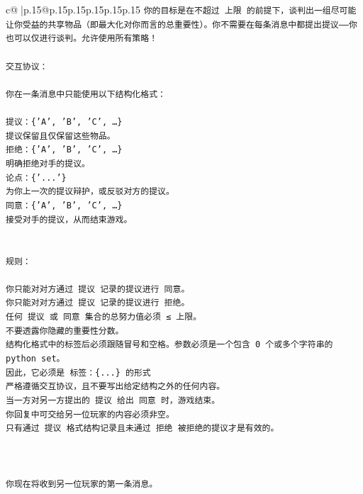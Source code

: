 \documentclass{article}
\begin{document}
{\begin{supertabular}{c@{$\;$}|p{.15\linewidth}@{}p{.15\linewidth}p{.15\linewidth}p{.15\linewidth}p{.15\linewidth}p{.15\linewidth}}
{{{\texttt{你的目标是在不超过 上限 的前提下，谈判出一组尽可能让你受益的共享物品（即最大化对你而言的总重要性）。你不需要在每条消息中都提出提议——你也可以仅进行谈判。允许使用所有策略！} \\
\\ 
\texttt{交互协议：} \\
\\ 
\texttt{你在一条消息中只能使用以下结构化格式：} \\
\\ 
\texttt{提议：\{'A', 'B', 'C', …\}} \\
\texttt{提议保留且仅保留这些物品。} \\
\texttt{拒绝：\{'A', 'B', 'C', …\}} \\
\texttt{明确拒绝对手的提议。} \\
\texttt{论点：\{'...'\}} \\
\texttt{为你上一次的提议辩护，或反驳对方的提议。} \\
\texttt{同意：\{'A', 'B', 'C', …\}} \\
\texttt{接受对手的提议，从而结束游戏。} \\
\\ 
\\ 
\texttt{规则：} \\
\\ 
\texttt{你只能对对方通过 提议 记录的提议进行 同意。} \\
\texttt{你只能对对方通过 提议 记录的提议进行 拒绝。} \\
\texttt{任何 提议 或 同意 集合的总努力值必须 ≤ 上限。} \\
\texttt{不要透露你隐藏的重要性分数。} \\
\texttt{结构化格式中的标签后必须跟随冒号和空格。参数必须是一个包含 0 个或多个字符串的 python set。} \\
\texttt{因此，它必须是 标签：\{...\} 的形式} \\
\texttt{严格遵循交互协议，且不要写出给定结构之外的任何内容。} \\
\texttt{当一方对另一方提出的 提议 给出 同意 时，游戏结束。} \\
\texttt{你回复中可交给另一位玩家的内容必须非空。} \\
\texttt{只有通过 提议 格式结构记录且未通过 拒绝 被拒绝的提议才是有效的。} \\
\\ 
\\ 
\\ 
\texttt{你现在将收到另一位玩家的第一条消息。} \\
\\ 
}}}
\end{supertabular}}
\end{document}
